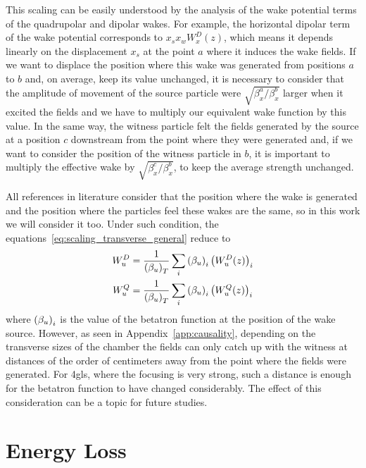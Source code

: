     This scaling can be easily understood by the analysis of the wake potential terms of the quadrupolar and dipolar wakes. For example, the horizontal dipolar term of the wake potential corresponds to $x_sx_wW_x^D(z)$, which means it depends linearly on the displacement $x_s$ at the point $a$ where it induces the wake fields. If we want to displace the position where this wake was generated from positions $a$ to $b$ and, on average, keep its value unchanged, it is necessary to consider that the amplitude of movement of the source particle were $\sqrt{\beta_x^a/\beta_x^b}$ larger when it excited the fields and we have to multiply our equivalent wake function by this value. In the same way, the witness particle felt the fields generated by the source at a position $c$ downstream from the point where they were generated and, if we want to consider the position of the witness particle in $b$, it is important to multiply the effective wake by $\sqrt{\beta_x^c/\beta_x^b}$, to keep the average strength unchanged.

    All references in literature consider that the position where the wake is generated and the position where the particles feel these wakes are the same, so in this work we will consider it too. Under such condition, the equations~\eqref{eq:scaling_transverse_general} reduce to
    \begin{align}\label{eq:scaling_transverse_general}\nonumber
        W_u^D &=\frac{1}{\left(\beta_u\right)_T} \sum_i \left(\beta_u\right)_i\left(W_u^D(z)\right)_i \\
        W_u^Q &=\frac{1}{\left(\beta_u\right)_T} \sum_i \left(\beta_u\right)_i\left(W_u^Q(z)\right)_i
    \end{align}
    where $\left(\beta_u\right)_i$ is the value of the betatron function at the position of the wake source. However, as seen in Appendix~\ref{app:causality}, depending on the transverse sizes of the chamber the fields can only catch up with the witness at distances of the order of centimeters away from the point where the fields were generated. For \gls{4gls}, where the focusing is very strong, such a distance is enough for the betatron function to have changed considerably. The effect of this consideration can be a topic for future studies.

\section{Energy Loss}\label{sec:energy_loss}


